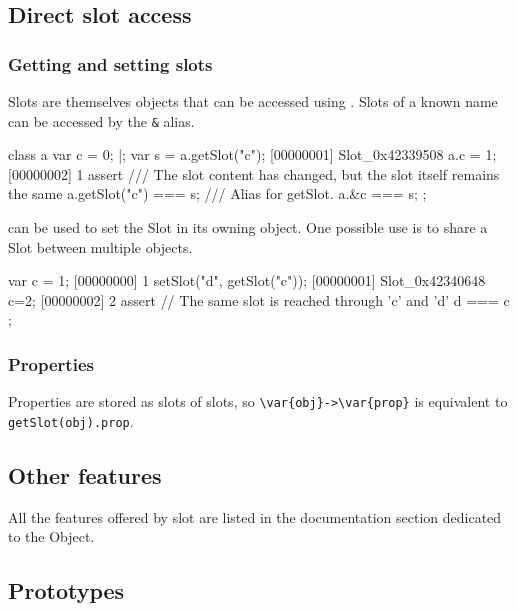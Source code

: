 \subsection{Direct slot access}

\subsubsection{Getting and setting slots}

Slots are themselves objects that can be accessed using
. Slots of a known name can be accessed by the
\lstinline|&| alias.

\begin{urbiscript}
class a {
  var c = 0;
}|;
var s = a.getSlot("c");
[00000001] Slot_0x42339508
a.c = 1;
[00000002] 1
assert
{
  /// The slot content has changed, but the slot itself remains the same
  a.getSlot("c") === s;
  /// Alias for getSlot.
  a.&c === s;
};
\end{urbiscript}

 can be used to set the Slot in its owning object.
One possible use is to share a Slot between multiple objects.

\begin{urbiscript}
var c = 1;
[00000000] 1
setSlot("d", getSlot("c"));
[00000001] Slot_0x42340648
c=2;
[00000002] 2
assert
{
  // The same slot is reached through 'c' and 'd'
  d === c
};

\end{urbiscript}

\subsubsection{Properties}

Properties are stored as slots of slots, so \lstinline|\var{obj}->\var{prop}|
is equivalent to \lstinline|getSlot(obj).prop|.

\subsection{Other features}

All the features offered by slot are listed in the documentation section
dedicated to the  Object.

\subsection{Prototypes}

